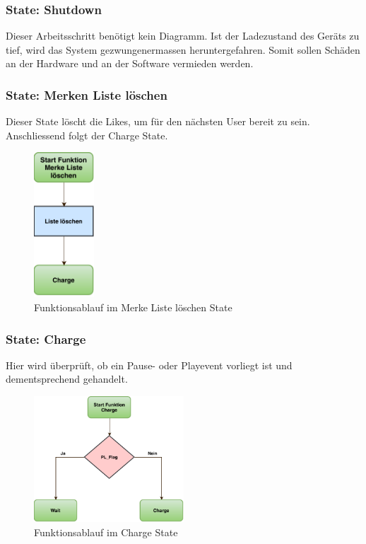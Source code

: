 \subsubsection*{State: Shutdown}

Dieser Arbeitsschritt benötigt kein Diagramm. Ist der Ladezustand des Geräts zu tief, wird das System gezwungenermassen heruntergefahren. Somit sollen Schäden an der Hardware und an der Software vermieden werden.

\subsubsection*{State: Merken Liste löschen}

Dieser State löscht die Likes, um für den nächsten User bereit zu sein. Anschliessend folgt der Charge State.

\begin{figure}[htbp!!!!]
	\centering
	\includegraphics[width=0.2\textwidth]{Data/MerkeListeLoeschen_picture.pdf}
	\caption[Statemachine: Merke Liste löschen]{Funktionsablauf im Merke Liste löschen State}
	\label{fig:merkeListeLoeschenState}
\end{figure} 

\subsubsection*{State: Charge}

Hier wird überprüft, ob ein Pause- oder Playevent vorliegt ist und dementsprechend gehandelt. 

\begin{figure}[htbp!!!!]
	\centering
	\includegraphics[width=0.5\textwidth]{Data/Charge_picture.pdf}
	\caption[Statemachine: Charge]{Funktionsablauf im Charge State}
	\label{fig:chargeState}
\end{figure} 


